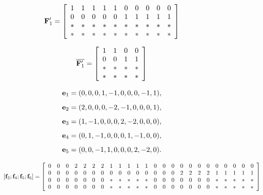 \documentclass[conference,letterpaper]{IEEEtran}
\begin{document}
\begin{equation} \label{eq:scheme 3 sub transmission}
{\bf F}^{\prime}_1= \left[
\begin{array}{cccccccccc}
  1 & 1 & 1 & 1 & 1 & 0 & 0 & 0 & 0 & 0  \\
  0 & 0 & 0 & 0 & 0 & 1 & 1 & 1 & 1 & 1 \\
  * & * & * & * & * & * & * & * & * & * \\
  * & * & * & * & * & * & * & * & * & *
\end{array}
 \right]
\end{equation}

\begin{equation} \label{eq:scheme 3 sub sub transmission}
\overline{{\bf F}^{\prime}_1}= \left[
\begin{array}{cccc}
  1 & 1 & 0 & 0  \\
  0 & 0 & 1 & 1 \\
  * & * & * & *  \\
  * & * & * & *
\end{array}
 \right]
\end{equation}

\[
{\bf e}_1 = (0, 0, 0, 1, -1, 0, 0, 0, -1, 1),
\]
\[
{\bf e}_2 = (2, 0, 0, 0, -2, -1, 0, 0, 0, 1),
\]
\[
{\bf e}_3 = (1, -1, 0, 0, 0, 2, -2, 0, 0, 0),
\]
\[
{\bf e}_4 = (0, 1, -1, 0, 0, 0, 1, -1, 0, 0),
\]
\[
{\bf e}_5 = (0, 0, -1, 1, 0, 0, 0, 2, -2, 0).
\]
\begin{figure}
\begin{equation} \label{eq:scheme 3 transmission of second class}
\begin{aligned}
\left[ {{\bf f}}_3 ;  {{\bf f}}_4 ;  {{\bf f}}_5 ;  {{\bf f}}_6 \right] = 
 \left[
\begin{array}{cccccccccccccccccccccccc}
 0 & 0 & 0 &  2 & 2 & 2 & 2 &  1 & 1 & 1 & 1 & 1 & 0 & 0 & 0 & 0 & 0 & 0 & 0 & 0 & 0 & 0 & 0 & 0 \\
 0 & 0 & 0 & 0 & 0 & 0 & 0 & 0 & 0 & 0 & 0 & 0 & 0 & 0 & 0 & 2 & 2 & 2 & 2 & 1 & 1 & 1 & 1 & 1 \\
 0 & 0 & 0 & 0 & 0 & 0 & 0 & * & * & * & * & * & 0 & 0 & 0 & 0 & 0 & 0 & 0 & * & * & * & * & * \\
 0 & 0 & 0 & 0 & 0 & 0 & 0 & * & * & * & * & * & 0 & 0 & 0 & 0 & 0 & 0 & 0 & * & * & * & * & *
\end{array}
 \right]
\end{aligned}
\end{equation}
\end{figure}
\end{document}

